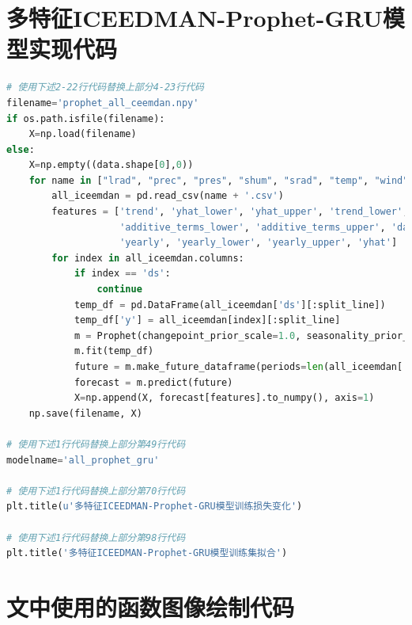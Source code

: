 \documentclass[AutoFakeBold]{LZUThesis}
\begin{document}
\section{多特征ICEEDMAN-Prophet-GRU模型实现代码}

\begin{lstlisting}[language = python]
# 使用下述2-22行代码替换上部分4-23行代码
filename='prophet_all_ceemdan.npy'
if os.path.isfile(filename):
    X=np.load(filename)
else:
    X=np.empty((data.shape[0],0))
    for name in ["lrad", "prec", "pres", "shum", "srad", "temp", "wind"]:
        all_iceemdan = pd.read_csv(name + '.csv')
        features = ['trend', 'yhat_lower', 'yhat_upper', 'trend_lower', 'trend_upper', 'additive_terms',
                    'additive_terms_lower', 'additive_terms_upper', 'daily', 'daily_lower', 'daily_upper',
                    'yearly', 'yearly_lower', 'yearly_upper', 'yhat']
        for index in all_iceemdan.columns:
            if index == 'ds':
                continue
            temp_df = pd.DataFrame(all_iceemdan['ds'][:split_line])
            temp_df['y'] = all_iceemdan[index][:split_line]
            m = Prophet(changepoint_prior_scale=1.0, seasonality_prior_scale=0.1, seasonality_mode='additive', changepoint_range=1, yearly_seasonality=True)
            m.fit(temp_df)
            future = m.make_future_dataframe(periods=len(all_iceemdan['ds'])-split_line, freq='3H')
            forecast = m.predict(future)
            X=np.append(X, forecast[features].to_numpy(), axis=1)
    np.save(filename, X)

# 使用下述1行代码替换上部分第49行代码
modelname='all_prophet_gru'

# 使用下述1行代码替换上部分第70行代码
plt.title(u'多特征ICEEDMAN-Prophet-GRU模型训练损失变化')

# 使用下述1行代码替换上部分第98行代码
plt.title('多特征ICEEDMAN-Prophet-GRU模型训练集拟合')
\end{lstlisting}

\section{文中使用的函数图像绘制代码}
\end{document}
